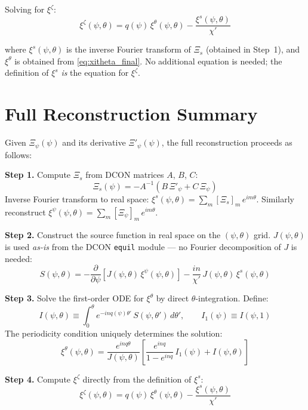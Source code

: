 \documentclass[12pt,a4paper]{article}
\begin{document}
Solving for $\xi^\zeta$:
\begin{equation}
    \boxed{
    \xi^\zeta(\psi,\theta) = q(\psi)\,\xi^\theta(\psi,\theta) - \frac{\xi^s(\psi,\theta)}{\chi'}
    }
    \label{eq:xizeta_final}
\end{equation}

where $\xi^s(\psi,\theta)$ is the inverse Fourier transform of $\Xi_s$ (obtained in Step~1), and $\xi^\theta$ is obtained from \eqref{eq:xitheta_final}. No additional equation is needed; the definition of $\xi^s$ \emph{is} the equation for $\xi^\zeta$.

\section{Full Reconstruction Summary}

Given $\Xi_\psi(\psi)$ and its derivative $\Xi'_\psi(\psi)$, the full reconstruction proceeds as follows:

\begin{tcolorbox}[colback=blue!5!white, colframe=blue!60!black, title=\textbf{Reconstruction of $\xi^\theta$ and $\xi^\zeta$}, breakable]

\textbf{Step 1.} Compute $\Xi_s$ from DCON matrices $A$, $B$, $C$:
\begin{equation}
    \Xi_s(\psi) = -A^{-1}\!\left(B\,\Xi'_\psi + C\,\Xi_\psi\right)
    \tag{49}
\end{equation}
Inverse Fourier transform to real space: $\xi^s(\psi,\theta) = \sum_m [\Xi_s]_m\,e^{im\theta}$. Similarly reconstruct $\xi^\psi(\psi,\theta) = \sum_m [\Xi_\psi]_m\,e^{im\theta}$.

\medskip
\textbf{Step 2.} Construct the source function in real space on the $(\psi,\theta)$ grid. $J(\psi,\theta)$ is used \emph{as-is} from the DCON \texttt{equil} module --- no Fourier decomposition of $J$ is needed:
\begin{equation}
    S(\psi,\theta) = -\frac{\partial}{\partial\psi}\!\left[J(\psi,\theta)\,\xi^\psi(\psi,\theta)\right] - \frac{in}{\chi'}\,J(\psi,\theta)\,\xi^s(\psi,\theta)
\end{equation}

\medskip
\textbf{Step 3.} Solve the first-order ODE for $\xi^\theta$ by direct $\theta$-integration. Define:
\begin{equation}
    I(\psi,\theta) \equiv \int_0^\theta e^{-inq(\psi)\theta'}\,S(\psi,\theta')\,d\theta', \qquad I_1(\psi) \equiv I(\psi,1)
\end{equation}
The periodicity condition uniquely determines the solution:
\begin{equation}
    \xi^\theta(\psi,\theta) = \frac{e^{inq\theta}}{J(\psi,\theta)}\left[\frac{e^{inq}}{1-e^{inq}}\,I_1(\psi) + I(\psi,\theta)\right]
\end{equation}

\medskip
\textbf{Step 4.} Compute $\xi^\zeta$ directly from the definition of $\xi^s$:
\begin{equation}
    \xi^\zeta(\psi,\theta) = q(\psi)\,\xi^\theta(\psi,\theta) - \frac{\xi^s(\psi,\theta)}{\chi'}
\end{equation}

\end{tcolorbox}
\end{document}
